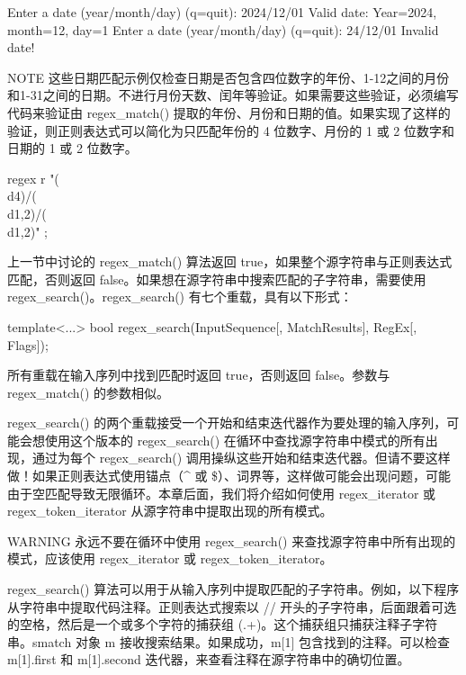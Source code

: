 \begin{shell}
Enter a date (year/month/day) (q=quit): 2024/12/01
    Valid date: Year=2024, month=12, day=1
Enter a date (year/month/day) (q=quit): 24/12/01
    Invalid date!
\end{shell}

\begin{myNotic}{NOTE}
这些日期匹配示例仅检查日期是否包含四位数字的年份、1-12之间的月份和1-31之间的日期。不进行月份天数、闰年等验证。如果需要这些验证，必须编写代码来验证由 regex\_match() 提取的年份、月份和日期的值。如果实现了这样的验证，则正则表达式可以简化为只匹配年份的 4 位数字、月份的 1 或 2 位数字和日期的 1 或 2 位数字。

\begin{cpp}
regex r { "(\\d{4})/(\\d{1,2})/(\\d{1,2})" };
\end{cpp}
\end{myNotic}


上一节中讨论的 regex\_match() 算法返回 true，如果整个源字符串与正则表达式匹配，否则返回 false。如果想在源字符串中搜索匹配的子字符串，需要使用 regex\_search()。regex\_search() 有七个重载，具有以下形式：

\begin{cpp}
template<...>
bool regex_search(InputSequence[, MatchResults], RegEx[, Flags]);
\end{cpp}

所有重载在输入序列中找到匹配时返回 true，否则返回 false。参数与 regex\_match() 的参数相似。

regex\_search() 的两个重载接受一个开始和结束迭代器作为要处理的输入序列，可能会想使用这个版本的 regex\_search() 在循环中查找源字符串中模式的所有出现，通过为每个 regex\_search() 调用操纵这些开始和结束迭代器。但请不要这样做！如果正则表达式使用锚点（\^{} 或 \$）、词界等，这样做可能会出现问题，可能由于空匹配导致无限循环。本章后面，我们将介绍如何使用 regex\_iterator 或 regex\_token\_iterator 从源字符串中提取出现的所有模式。

\begin{myWarning}{WARNING}
永远不要在循环中使用 regex\_search() 来查找源字符串中所有出现的模式，应该使用 regex\_iterator 或 regex\_token\_iterator。
\end{myWarning}


regex\_search() 算法可以用于从输入序列中提取匹配的子字符串。例如，以下程序从字符串中提取代码注释。正则表达式搜索以 // 开头的子字符串，后面跟着可选的空格，然后是一个或多个字符的捕获组 (.+)。这个捕获组只捕获注释子字符串。smatch 对象 m 接收搜索结果。如果成功，m[1] 包含找到的注释。可以检查 m[1].first 和 m[1].second 迭代器，来查看注释在源字符串中的确切位置。


